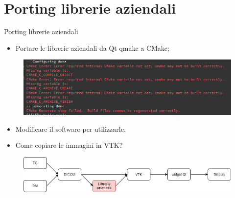 \documentclass{beamer}
\begin{document}
	\section{Porting librerie aziendali}
	\begin{frame}{Porting librerie aziendali}

	\begin{itemize}
		\item Portare le librerie aziendali da Qt qmake a CMake;
	\end{itemize}
	
	\begin{figure}[ht]
    	\centering
    	\includegraphics[width=.8\textwidth]{Images/cmakeerror.png}
	\end{figure}
	
	\begin{itemize}
		\item Modificare il software per utilizzarle;
		\item Come copiare le immagini in VTK?
	\end{itemize}
	
	\begin{figure}[ht]
    	\centering
    	\includegraphics[width=1\textwidth]{Images/librerieaziendali.png}
	\end{figure}
	
	\end{frame}
	
	
\end{document}
